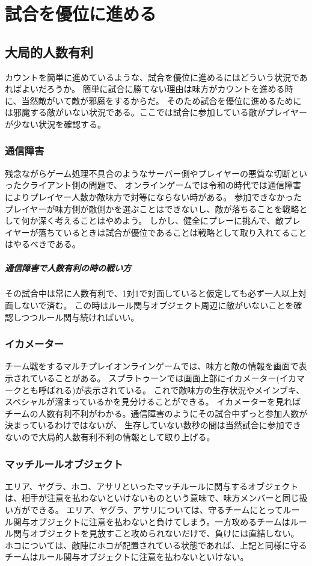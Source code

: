 \documentclass[a4paper,11pt]{jsbook}
\begin{document}
\chapter{試合を優位に進める}
\section{大局的人数有利}
カウントを簡単に進めているような、試合を優位に進めるにはどういう状況であればよいだろうか。
簡単に試合に勝てない理由は味方がカウントを進める時に、当然敵がいて敵が邪魔をするからだ。
そのため試合を優位に進めるためには邪魔する敵がいない状況である。ここでは試合に参加している敵がプレイヤーが少ない状況を確認する。

\subsection{通信障害}
残念ながらゲーム処理不具合のようなサーバー側やプレイヤーの悪質な切断といったクライアント側の問題で、
オンラインゲームでは令和の時代では通信障害によりプレイヤー人数か敵味方で対等にならない時がある。
参加できなかったプレイヤーが味方側が敵側かを選ぶことはできないし、敵が落ちることを戦略として何か深く考えることはやめよう。
しかし、健全にプレーに挑んで、敵プレイヤーが落ちているときは試合が優位であることは戦略として取り入れてることはやるべきである。
\paragraph{通信障害で人数有利の時の戦い方}
その試合中は常に人数有利で、1対1で対面していると仮定しても必ず一人以上対面しないで済む。
この時はルール関与オブジェクト周辺に敵がいないことを確認しつつルール関与続ければいい。



\subsection{イカメーター}
チーム戦をするマルチプレイオンラインゲームでは、味方と敵の情報を画面で表示されていることがある。
スプラトゥーンでは画面上部にイカメーター(イカマークとも呼ばれる)が表示されている。
これで敵味方の生存状況やメインブキ、スペシャルが溜まっているかを見分けることができる。
イカメーターを見ればチームの人数有利不利がわかる。通信障害のようにその試合中ずっと参加人数が決まっているわけではないが、
生存していない数秒の間は当然試合に参加できないので大局的人数有利不利の情報として取り上げる。


\subsection{マッチルールオブジェクト}
エリア、ヤグラ、ホコ、アサリといったマッチルールに関与するオブジェクトは、相手が注意を払わないといけないものという意味で、味方メンバーと同じ扱い方ができる。
エリア、ヤグラ、アサリについては、守るチームにとってルール関与オブジェクトに注意を払わないと負けてしまう。一方攻めるチームはルール関与オブジェクトを見放すこと攻められないだけで、負けには直結しない。
ホコについては、敵陣にホコが配置されている状態であれば、上記と同様に守るチームはルール関与オブジェクトに注意を払わないといけない。
\end{document}
